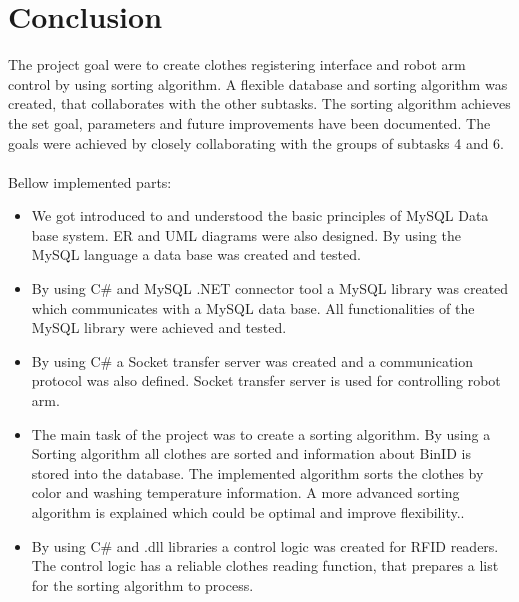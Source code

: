 \section{Conclusion}


The project goal were to create clothes registering interface and robot arm control by using sorting algorithm. A flexible database and sorting algorithm was created, that collaborates with the other subtasks. The sorting algorithm achieves the set goal, parameters and future improvements have been documented. The goals were achieved by closely collaborating with the groups of subtasks 4 and 6. 
\\ \\
Bellow implemented parts:
\\
\begin{itemize}
	\item We got introduced to and understood the basic principles of MySQL Data base system. ER and UML diagrams were also designed. By using the MySQL language a data base was created and tested.

	\item By using C\# and MySQL .NET connector tool a MySQL library was created which communicates with a MySQL data base. All functionalities of the MySQL library were achieved and tested.

	\item By using C\# a Socket transfer server was created and a communication protocol was also defined. Socket transfer server is used for controlling robot arm.

	\item The main task of the project was to create a sorting algorithm. By using a Sorting algorithm all clothes are sorted and information about BinID is stored into the
database. The implemented algorithm sorts the clothes by color and washing temperature information. A more advanced sorting algorithm is explained which could be optimal and improve flexibility..

	\item By using C\# and .dll libraries a control logic was created for RFID readers. The control logic has a reliable clothes reading function, that prepares a list for the sorting algorithm to process.
\end{itemize}
